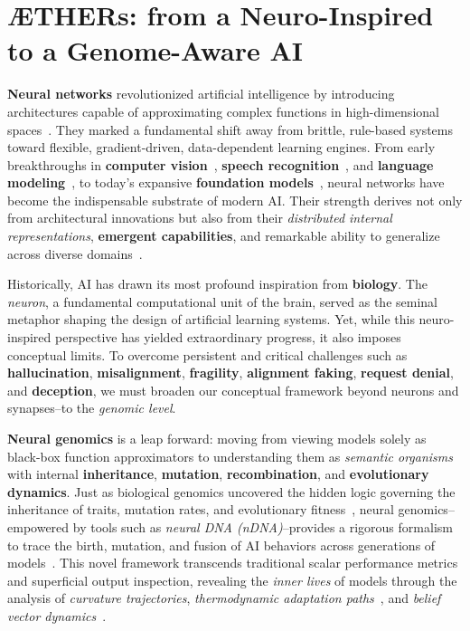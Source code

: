 
\section*{ÆTHERs: from a Neuro-Inspired to a Genome-Aware AI}

\vspace{-2mm}
\noindent
\textbf{Neural networks} revolutionized artificial intelligence by introducing architectures capable of approximating complex functions in high-dimensional spaces~\citep{lecun2015deep, goodfellow2016deep}. They marked a fundamental shift away from brittle, rule-based systems toward flexible, gradient-driven, data-dependent learning engines. From early breakthroughs in \textbf{computer vision}~\citep{Krizhevsky2012ImageNet}, \textbf{speech recognition}~\citep{hinton2012deep}, and \textbf{language modeling}~\citep{vaswani2017attention}, to today’s expansive \textbf{foundation models}~\citep{brown2020language, touvron2023llama}, neural networks have become the indispensable substrate of modern AI. Their strength derives not only from architectural innovations but also from their \emph{distributed internal representations}, \textbf{emergent capabilities}, and remarkable ability to generalize across diverse domains~\citep{bommasani2021opportunities}.

\vspace{1mm}
Historically, AI has drawn its most profound inspiration from \textbf{biology}. The \emph{neuron}, a fundamental computational unit of the brain, served as the seminal metaphor shaping the design of artificial learning systems. Yet, while this neuro-inspired perspective has yielded extraordinary progress, it also imposes conceptual limits. To overcome persistent and critical challenges such as \textbf{hallucination}, \textbf{misalignment}, \textbf{fragility}, \textbf{alignment faking}, \textbf{request denial}, and \textbf{deception}, we must broaden our conceptual framework beyond neurons and synapses--to the \emph{genomic level}.

\vspace{1mm}
\textbf{Neural genomics} is a leap forward: moving from viewing models solely as black-box function approximators to understanding them as \emph{semantic organisms} with internal \textbf{inheritance}, \textbf{mutation}, \textbf{recombination}, and \textbf{evolutionary dynamics}. Just as biological genomics uncovered the hidden logic governing the inheritance of traits, mutation rates, and evolutionary fitness~\citep{felsenstein2004inferring, kimura1983neutral}, neural genomics--empowered by tools such as \emph{neural DNA (nDNA)}--provides a rigorous formalism to trace the birth, mutation, and fusion of AI behaviors across generations of models~\citep{matena2022merging, ilharco2023editing}. This novel framework transcends traditional scalar performance metrics and superficial output inspection, revealing the \emph{inner lives} of models through the analysis of \emph{curvature trajectories}, \emph{thermodynamic adaptation paths}~\citep{banerjee2023thermodynamic}, and \emph{belief vector dynamics}~\citep{ganguli2023reducing}.

